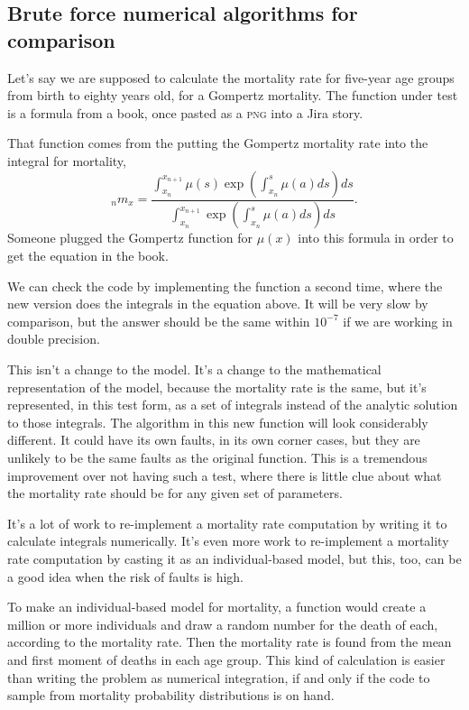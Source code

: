 \documentclass[fleqn,10pt]{olplainarticle}
\begin{document}
\subsection{Brute force numerical algorithms for comparison}

Let's say we are supposed to calculate the mortality rate
for five-year age groups from birth to eighty years old,
for a Gompertz mortality. The function under test is a formula
from a book, once pasted as a \textsc{png} into a Jira story.

That function comes from the putting the Gompertz mortality
rate into the integral for mortality,
\begin{equation}
  {}_nm_x = \frac{\int_{x_n}^{x_{n+1}}\mu(s) \exp(\int_{x_n}^s\mu(a)ds)ds}{\int_{x_n}^{x_{n+1}}\exp(\int_{x_n}^s\mu(a)ds)ds}.
\end{equation}
Someone plugged the Gompertz function for $\mu(x)$ into this
formula in order to get the equation in the book.

We can check the code by implementing the function a second
time, where the new version does the integrals in the equation
above. It will be very slow by comparison, but the answer should
be the same within $10^{-7}$ if we are working in double precision.

This isn't a change to the model. It's a change to the 
mathematical representation of the model, because the mortality
rate is the same, but it's represented, in this test form,
as a set of integrals instead of the analytic solution to
those integrals. The algorithm in this new function will look
considerably different. It could have its own faults, in its
own corner cases, but they are unlikely to be the same faults
as the original function. This is a tremendous improvement over
not having such a test, where there is little clue about what
the mortality rate should be for any given set of parameters.

It's a lot of work to re-implement a mortality rate
computation by writing it to calculate integrals numerically.
It's even more work to re-implement a mortality rate
computation by casting it as an individual-based model, but this,
too, can be a good idea when the risk of faults is high.

To make an individual-based model for mortality, a function would
create a million or more individuals and draw a random number for
the death of each, according to the mortality rate. Then the mortality
rate is found from the mean and first moment of deaths in each
age group.
This kind of calculation is easier than writing the problem as
numerical integration, if and only if the code to sample from
mortality probability distributions is on hand.
\end{document}
